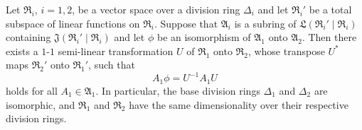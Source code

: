Let $\mathfrak{R}_i$, $i = 1, 2$, be a vector space over a division ring $\Delta_i$ and let $\mathfrak{R}_i'$ be a total subspace of linear functions on $\mathfrak{R}_i$. Suppose that $\mathfrak{A}_i$ is a subring of $\mathfrak{L}(\mathfrak{R}_i' \mid \mathfrak{R}_i)$ containing $\mathfrak{J}(\mathfrak{R}_i' \mid \mathfrak{R}_i)$ and let $\phi$ be an isomorphism of $\mathfrak{A}_1$ onto $\mathfrak{A}_2$. Then there exists a $1$-$1$ semi-linear transformation $U$ of $\mathfrak{R}_1$ onto $\mathfrak{R}_2$, whose transpose $U^*$ maps $\mathfrak{R}_2'$ onto $\mathfrak{R}_1'$, such that
$$A_1 \phi = U^{-1} A_1 U$$
holds for all $A_1 \in \mathfrak{A}_1$. In particular, the base division rings $\Delta_1$ and $\Delta_2$ are isomorphic, and $\mathfrak{R}_1$ and $\mathfrak{R}_2$ have the same dimensionality over their respective division rings.
